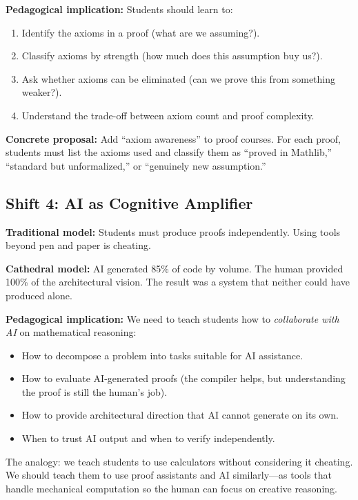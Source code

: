 \documentclass[11pt,a4paper]{article}
\begin{document}
\textbf{Pedagogical implication:} Students should learn to:
\begin{enumerate}
  \item Identify the axioms in a proof (what are we assuming?).
  \item Classify axioms by strength (how much does this assumption
    buy us?).
  \item Ask whether axioms can be eliminated (can we prove this
    from something weaker?).
  \item Understand the trade-off between axiom count and proof
    complexity.
\end{enumerate}

\textbf{Concrete proposal:} Add ``axiom awareness'' to proof
courses. For each proof, students must list the axioms used and
classify them as ``proved in Mathlib,'' ``standard but unformalized,''
or ``genuinely new assumption.''

\subsection{Shift 4: AI as Cognitive Amplifier}

\textbf{Traditional model:} Students must produce proofs
independently. Using tools beyond pen and paper is cheating.

\textbf{Cathedral model:} AI generated 85\% of code by volume.
The human provided 100\% of the architectural vision. The result
was a system that neither could have produced alone.

\textbf{Pedagogical implication:} We need to teach students how
to \emph{collaborate with AI} on mathematical reasoning:

\begin{itemize}
  \item How to decompose a problem into tasks suitable for AI
    assistance.
  \item How to evaluate AI-generated proofs (the compiler helps,
    but understanding the proof is still the human's job).
  \item How to provide architectural direction that AI cannot
    generate on its own.
  \item When to trust AI output and when to verify independently.
\end{itemize}

The analogy: we teach students to use calculators without
considering it cheating. We should teach them to use proof
assistants and AI similarly---as tools that handle mechanical
computation so the human can focus on creative reasoning.
\end{document}
